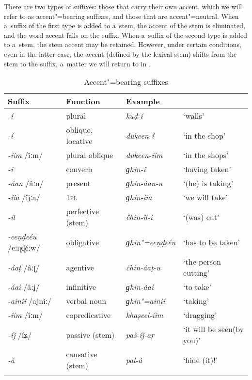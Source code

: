 There are two types of suffixes: those that carry their own accent, which we will refer to as
accent"=bearing suffixes, and those that are accent"=neutral. When a~suffix of the first type is added
to a~stem, the accent of the stem is eliminated, and the word accent falls on the suffix. When
a~suffix of the second type is added to a~stem, the stem accent may be retained. However, under
certain conditions, even in the latter case, the accent (defined by the lexical stem) shifts from
the stem to the suffix, a~matter we will return to in .

\begin{table}[ht]
\caption{Accent"=bearing suffixes}
\begin{tabularx}{\textwidth}{ l l l Q }
\lsptoprule
Suffix &
Function &
Example &
\\\hline
\textit{-í} &
plural &
\textit{kuḍ-í} &
`walls'\\
\textit{-í} &
oblique, locative &
\textit{dukeen-í} &
`in the shop'\\
\textit{-íim} /îːm/ &
plural oblique &
\textit{dukeen-íim} &
`in the shops'\\
\textit{-í} &
converb &
\textit{ɡhin-í} &
`having taken'\\
\textit{-áan} /âːn/ &
present &
\textit{ɡhin-áan-u} &
`(he) is taking'\\
\textit{-íia} /îjːa/ &
\textsc{1pl} &
\textit{ɡhin-íia} &
`we will take'\\
\textit{-íl} &
perfective (stem) &
\textit{čhin-íl-i} &
`(was) cut'\\
\textit{-eeṇḍeéu} /eːɳɖěːw/ &
obligative &
\textit{ɡhin"=eeṇḍeéu} &
`has to be taken'\\
\textit{-áaṭ} /âːʈ/ &
agentive &
\textit{čhin-áaṭ-u} &
`the person cutting'\\
\textit{-áai} /âːj/ &
infinitive &
\textit{ɡhin-áai} &
`to take'\\
\textit{-ainií} /ajnǐː/ &
verbal noun &
\textit{ɡhin"=ainií} &
`taking'\\
\textit{-íim} /îːm/ &
copredicative &
\textit{khaṣeel-íim} &
`dragging'\\
\textit{-íǰ} /íʑ/ &
passive (stem) &
\textit{paš-íǰ-aṛ} &
`it will be seen\newline (by you)'\\
\textit{-á} &
causative (stem) &
\textit{pal-á} &
`hide (it)!'\\\lspbottomrule
\end{tabularx}
\label{tab:3-5}
\end{table}


